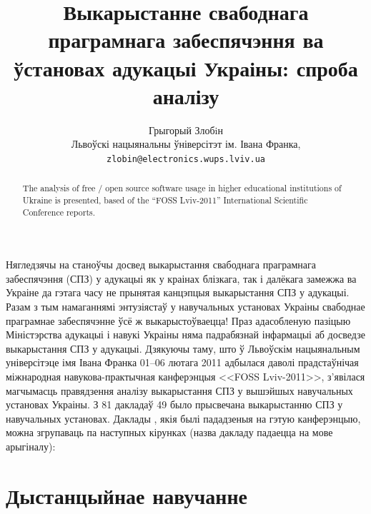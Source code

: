\documentclass[10pt, a5paper]{article}
\begin{document}
\renewcommand{\figurename}{Рыс.} %
\renewcommand{\abstractname}{Анатацыя}
\renewcommand{\refname}{Літаратура}

\title{Выкарыстанне свабоднага праграмнага забеспячэння ва ўстановах адукацыі Украіны: спроба аналізу}

\author{Грыгорый Злобiн\\
\small Львоўскі нацыянальны ўніверсітэт ім. Івана Франка,\\
\small \texttt{zlobin@electronics.wups.lviv.ua}
}
\date{}

\maketitle

\begin{abstract}
The analysis of free / open source software usage in higher educational institutions of Ukraine is presented, based of the ``FOSS Lviv-2011''  International Scientific Conference reports. 
\end{abstract}

Нягледзячы на станоўчы досвед выкарыстання свабоднага праграмнага забеспячэння (СПЗ) у адукацыі як у краінах блізкага, так і далёкага замежжа ва Украіне да гэтага часу не прынятая канцэпцыя выкарыстання СПЗ у адукацыі. Разам з тым намаганнямі энтузіястаў у навучальных установах Украіны свабоднае праграмнае забеспячэнне ўсё ж выкарыстоўваецца! Праз адасобленую пазіцыю Міністэрства адукацыі і навукі Украіны няма падрабязнай інфармацыі аб досведзе выкарыстання СПЗ у адукацыі. Дзякуючы таму, што ў Львоўскім нацыянальным універсітэце імя Івана Франка 01--06 лютага 2011 адбылася даволі прадстаўнічая міжнародная навукова-практычная канферэнцыя <<FOSS Lviv-2011>>, з'явілася магчымасць правядзення аналізу выкарыстання СПЗ у вышэйшых навучальных установах Украіны. З 81 дакладаў 49 было прысвечана выкарыстанню СПЗ у навучальных установах. Даклады \cite{fosslviv}, якія былі пададзеныя на гэтую канферэнцыю, можна згрупаваць па наступных кірунках (назва дакладу падаецца на мове арыгіналу):

\section{Дыстанцыйнае навучанне}
\end{document}
